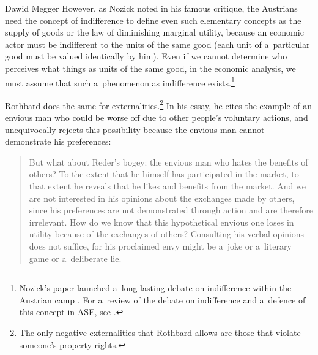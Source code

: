 \begin{artengenv}{Dawid Megger}
However, as Nozick 
\parencite*[][]{nozick_austrian_1977} %
 noted in his famous critique, the Austrians need the concept of indifference to define even such elementary concepts as the supply of goods or the law of diminishing marginal utility, because an economic actor must be indifferent to the units of the same good (each unit of a~particular good must be valued identically by him). Even if we cannot determine who perceives what things as units of the same good, in the economic analysis, we must assume that such a~phenomenon as indifference exists.\footnote{Nozick's paper launched a~long-lasting debate on indifference within the Austrian camp 
\parencites[see e.g.,][]{block_robert_1980}[][]{block_rejoinder_2009}[][]{block_rejoinder_2010}[][]{hoppe_note_2005}[][]{hoppe_further_2009}[][]{machaj_praxeological_2007}[][]{wysocki_indifference_2016}[][]{wysocki_note_2017}. %
 For a~review of the debate on indifference and a~defence of this concept in ASE, see 
\parencite[][]{wysocki_austro-libertarian_2021}.%
}



Rothbard does the same for externalities.\footnote{The only negative externalities that Rothbard allows are those that violate someone's property rights.} In his essay, he cites the example of an envious man who could be worse off due to other people's voluntary actions, and unequivocally rejects this possibility because the envious man cannot demonstrate his preferences:



\begin{quote}
But what about Reder's bogey: the envious man who hates the benefits of others? To the extent that he himself has participated in the market, to that extent he reveals that he likes and benefits from the market. And we are not interested in his opinions about the exchanges made by others, since his preferences are not demonstrated through action and are therefore irrelevant. How do we know that this hypothetical envious one loses in utility because of the exchanges of others? Consulting his verbal opinions does not suffice, for his proclaimed envy might be a~joke or a~literary game or a~deliberate lie. 
\parencite[][p.320]{rothbard_present_2011}%
\end{quote}





\end{artengenv}
